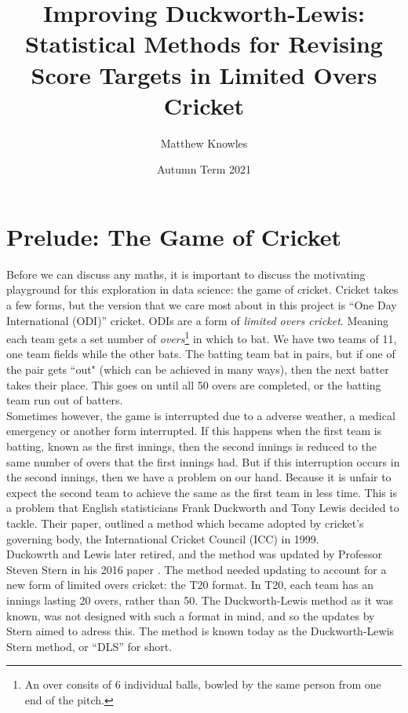 \documentclass[11pt]{amsart}
\title[Improving DLS]{Improving Duckworth-Lewis: Statistical Methods for Revising Score Targets in Limited Overs Cricket}
\author{Matthew Knowles}
\date{Autumn Term 2021}
\begin{document}
\maketitle

\section{Prelude: The Game of Cricket}
Before we can discuss any maths, it is important to discuss the motivating playground for this exploration in data science: the game of cricket.
Cricket takes a few forms, but the version that we care most about in this project is ``One Day International (ODI)'' cricket. ODIs are a form of 
\textit{limited overs cricket}. Meaning each team gets a set number of \textit{overs}\footnote{An over consits of 6 individual balls, bowled by the same person from one end of the pitch.} in which to bat. We have two teams of 11, one team fields
while the other bats. The batting team bat in pairs, but if one of the pair gets ``out" (which can be achieved in many ways), then the next batter takes their place.
This goes on until all 50 overs are completed, or the batting team run out of batters. \\

Sometimes however, the game is interrupted due to a adverse weather, a medical emergency or another form interrupted. If this happens when the first team is batting,
known as the first innings, then the second innings is reduced to the same number of overs that the first innings had. But if this interruption occurs in the second 
innings, then we have a problem on our hand. Because it is unfair to expect the second team to achieve the same as the first team in less time. 
This is a problem that English statisticians Frank Duckworth and Tony Lewis decided to tackle. Their paper, \cite{duckworth} outlined a method which became 
adopted by cricket's governing body, the International Cricket Council (ICC) in 1999. \\

Duckowrth and Lewis later retired, and the method was updated by Professor Steven Stern in his 2016 paper \cite{stern}. The method needed
updating to account for a new form of limited overs cricket: the T20 format. In T20, each team has an innings lasting 20 overs, rather than 50. The Duckworth-Lewis method as it was known,
was not designed with such a format in mind, and so the updates by Stern aimed to adress this. The method is known today as the Duckworth-Lewis Stern method, or ``DLS'' for short.
\end{document}
